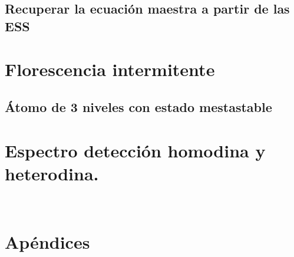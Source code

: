 \documentclass[11pt]{report}
\begin{document}
\section{Recuperar la ecuación maestra a partir de las ESS}


\chapter{Florescencia intermitente}
\section{Átomo de 3 niveles con estado mestastable}

\chapter{Espectro detección homodina y heterodina.}
\
\chapter{Apéndices}

\printbibliography[heading=bibintoc]
\end{document}
